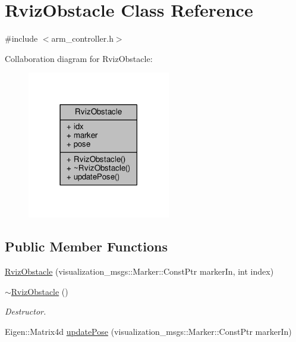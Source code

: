 \hypertarget{class_rviz_obstacle}{}\section{Rviz\+Obstacle Class Reference}
\label{class_rviz_obstacle}


{\ttfamily \#include $<$arm\+\_\+controller.\+h$>$}



Collaboration diagram for Rviz\+Obstacle\+:
\nopagebreak
\begin{figure}[H]
\begin{center}
\leavevmode
\includegraphics[width=177pt]{class_rviz_obstacle__coll__graph}
\end{center}
\end{figure}
\subsection*{Public Member Functions}
\begin{DoxyCompactItemize}
\item 
\hyperlink{class_rviz_obstacle_a3fb19f60434581b669c0dc063c026943}{Rviz\+Obstacle} (visualization\+\_\+msgs\+::\+Marker\+::\+Const\+Ptr marker\+In, int index)
\item 
\hyperlink{class_rviz_obstacle_aefa092d8dcad532408308c34cb4cddbe}{$\sim$\+Rviz\+Obstacle} ()
\begin{DoxyCompactList}\small\item\em Destructor. \end{DoxyCompactList}\item 
Eigen\+::\+Matrix4d \hyperlink{class_rviz_obstacle_a30101e2a3c65776bb4abbb139f10b14a}{update\+Pose} (visualization\+\_\+msgs\+::\+Marker\+::\+Const\+Ptr marker\+In)
\end{DoxyCompactItemize}
